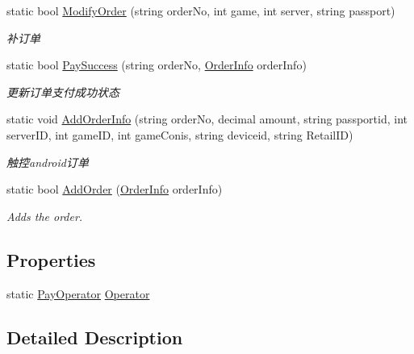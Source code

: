 \begin{DoxyCompactItemize}
static bool \mbox{\hyperlink{class_t_net_1_1_pay_1_1_pay_manager_a817c81b4ccfe14359e22fb66a9774dbc}{Modify\+Order}} (string order\+No, int game, int server, string passport)
\begin{DoxyCompactList}\small\item\em 补订单 \end{DoxyCompactList}\item 
static bool \mbox{\hyperlink{class_t_net_1_1_pay_1_1_pay_manager_a7a1dec7054d26efe78284184aedc8dc0}{Pay\+Success}} (string order\+No, \mbox{\hyperlink{class_t_net_1_1_pay_1_1_order_info}{Order\+Info}} order\+Info)
\begin{DoxyCompactList}\small\item\em 更新订单支付成功状态 \end{DoxyCompactList}\item 
static void \mbox{\hyperlink{class_t_net_1_1_pay_1_1_pay_manager_abbcf45a23c290ab29146ae0efa5341dc}{Add\+Order\+Info}} (string order\+No, decimal amount, string passportid, int server\+ID, int game\+ID, int game\+Conis, string deviceid, string Retail\+ID)
\begin{DoxyCompactList}\small\item\em 触控android订单 \end{DoxyCompactList}\item 
static bool \mbox{\hyperlink{class_t_net_1_1_pay_1_1_pay_manager_ab1aa823b8ab62c631d85e88a88ca7076}{Add\+Order}} (\mbox{\hyperlink{class_t_net_1_1_pay_1_1_order_info}{Order\+Info}} order\+Info)
\begin{DoxyCompactList}\small\item\em Adds the order. \end{DoxyCompactList}\end{DoxyCompactItemize}
\subsection*{Properties}
\begin{DoxyCompactItemize}
\item 
static \mbox{\hyperlink{class_t_net_1_1_pay_1_1_pay_operator}{Pay\+Operator}} \mbox{\hyperlink{class_t_net_1_1_pay_1_1_pay_manager_acf2fef0bec3662e64f9da07d2a36b7ce}{Operator}}
\end{DoxyCompactItemize}


\subsection{Detailed Description}




